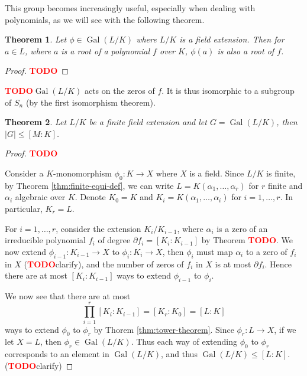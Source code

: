 \documentclass[12pt]{article}
\newtheorem{theorem}{Theorem}
\theoremstyle{definition}
\newcommand{\Gal}{\operatorname{Gal}}
\newcommand{\TODO}{\textbf{\textcolor{red}{TODO}}}
\begin{document}
This group becomes increasingly useful, especially when dealing with polynomials, as we will see with the following theorem.

\begin{theorem} \label{thm:galois-group-permutes-zeros}
Let $\phi \in \Gal(L/K)$ where $L/K$ is a field extension. Then for $a \in L$, where $a$ is a root of a polynomial $f$ over $K$, $\phi(a)$ is also a root of $f$.
\end{theorem}

\begin{proof}
    \TODO
\end{proof}


\TODO $\Gal(L/K)$ acts on the zeros of $f$. It is thus isomorphic to a subgroup of $S_n$ (by the first isomorphism theorem). 

\begin{theorem} \label{thm:galois-group-order-upper-bound}
    Let $L/K$ be a finite field extension and let $G = \Gal(L/K)$, then $|G| \le [M:K]$. 
\end{theorem}

\begin{proof}
    \TODO

    Consider a $K$-monomorphism $\phi_0 : K \to X$ where $X$ is a field. Since $L/K$ is finite, by Theorem \ref{thm:finite-equi-def}, we can write $L = K(\alpha_1, \ldots, \alpha_r)$ for $r$ finite and $\alpha_i$ algebraic over $K$. Denote $K_0 = K$ and
    $K_i = K(\alpha_1, \dots, \alpha_i)$ for $i = 1, \ldots, r$. In particular, $K_r = L$. 


    For $i = 1, \ldots, r$, consider the extension $K_i / K_{i-1}$, 
    where $\alpha_i$ is a zero of an irreducible polynomial $f_i$ of degree $\partial f_i = [K_i : K_{i-1}]$ by Theorem \TODO. We now extend $\phi_{i-1} : K_{i-1} \to X$ to $\phi_i: K_i \to X$, then $\phi_i$ must map $\alpha_i$ to a zero of $f_i$ in $X$ (\TODO clarify), and the number of zeros of $f_i$ in $X$ is at most $\partial f_i$. Hence there are at most $[K_i : K_{i-1}]$ ways to extend $\phi_{i-1}$ to $\phi_i$.

    We now see that there are at most $$\prod_{i=1} ^r [K_i : K_{i-1}] = [K_r : K_0] = [L : K]$$ ways to extend $\phi_0$ to $\phi_r$ by Thorem \ref{thm:tower-theorem}. Since $\phi_r : L \to X$, if we let $X = L$, then $\phi_r \in \Gal(L/K)$. Thus each way of extending $\phi_0$ to $\phi_r$ corresponds to an element in $\Gal(L/K)$, and thus $\Gal(L/K) \le [L:K]$. (\TODO clarify)
\end{proof}
\cite{galois-theory-lectures}
\end{document}
